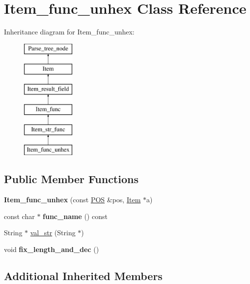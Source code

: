 \hypertarget{classItem__func__unhex}{}\section{Item\+\_\+func\+\_\+unhex Class Reference}
\label{classItem__func__unhex}
Inheritance diagram for Item\+\_\+func\+\_\+unhex\+:\begin{figure}[H]
\begin{center}
\leavevmode
\includegraphics[height=6.000000cm]{classItem__func__unhex}
\end{center}
\end{figure}
\subsection*{Public Member Functions}
\begin{DoxyCompactItemize}
\item 
\mbox{\label{classItem__func__unhex_a047b12d021a4c7ec062a075271ad1986}} 
{\bfseries Item\+\_\+func\+\_\+unhex} (const \mbox{\hyperlink{structYYLTYPE}{P\+OS}} \&pos, \mbox{\hyperlink{classItem}{Item}} $\ast$a)
\item 
\mbox{\label{classItem__func__unhex_adba758e1aeb049718698f479e05ea62d}} 
const char $\ast$ {\bfseries func\+\_\+name} () const
\item 
String $\ast$ \mbox{\hyperlink{classItem__func__unhex_a87230a96263c6c5324a6aba9a815a183}{val\+\_\+str}} (String $\ast$)
\item 
\mbox{\label{classItem__func__unhex_a22202c62f3b97fb68043397e0ea2dd93}} 
void {\bfseries fix\+\_\+length\+\_\+and\+\_\+dec} ()
\end{DoxyCompactItemize}
\subsection*{Additional Inherited Members}


